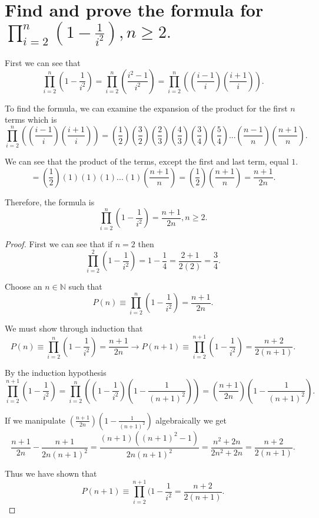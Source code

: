 \documentclass[11pt]{article}
\begin{document}
\section{Find and prove the formula for $\prod_{i=2}^{n}(1-\frac{1}{i^{2}}), n\geq 2.$}

First we can see that $$\prod_{i=2}^{n}(1-\frac{1}{i^{2}})=\prod_{i=2}^{n}(\frac{i^{2}-1}{i^{2}})=\prod_{i=2}^{n}((\frac{i-1}{i})(\frac{i+1}{i})).$$

To find the formula, we can examine the expansion of the product for the first $n$ terms which is $$\prod_{i=2}^{n}((\frac{i-1}{i})(\frac{i+1}{i}))=(\frac{1}{2})(\frac{3}{2})(\frac{2}{3})(\frac{4}{3})(\frac{3}{4})(\frac{5}{4})...(\frac{n-1}{n})(\frac{n+1}{n}).$$

We can see that the product of the terms, except the first and last term, equal $1$. $$=(\frac{1}{2})(1)(1)(1)...(1)(\frac{n+1}{n})=(\frac{1}{2})(\frac{n+1}{n})=\frac{n+1}{2n}.$$

Therefore, the formula is $$\prod_{i=2}^{n}(1-\frac{1}{i^{2}})=\frac{n+1}{2n}, n\geq2.$$

\begin{proof}
First we can see that if $n=2$ then $$\prod_{i=2}^{2}(1-\frac{1}{i^{2}})=1-\frac{1}{4}=\frac{2+1}{2(2)}=\frac{3}{4}.$$

Choose an $n\in\mathbb{N}$ such that $$P(n)\equiv\prod_{i=2}^{n}(1-\frac{1}{i^{2}})=\frac{n+1}{2n}.$$

We must show through induction that $$P(n)\equiv\prod_{i=2}^{n}(1-\frac{1}{i^{2}})=\frac{n+1}{2n}\longrightarrow P(n+1)\equiv\prod_{i=2}^{n+1}(1-\frac{1}{i^{2}})=\frac{n+2}{2(n+1)}.$$

By the induction hypothesis $$\prod_{i=2}^{n+1}(1-\frac{1}{i^{2}})=\prod_{i=2}^{n}((1-\frac{1}{i^{2}})(1-\frac{1}{(n+1)^{2}}))=(\frac{n+1}{2n})(1-\frac{1}{(n+1)^{2}}).$$

If we manipulate $(\frac{n+1}{2n})(1-\frac{1}{(n+1)^{2}})$ algebraically we get $$\frac{n+1}{2n}-\frac{n+1}{2n(n+1)^{2}}=\frac{(n+1)((n+1)^{2}-1)}{2n(n+1)^{2}}=\frac{n^{2}+2n}{2n^{2}+2n}=\frac{n+2}{2(n+1)}.$$

Thus we have shown that $$P(n+1)\equiv\prod_{i=2}^{n+1}(1-\frac{1}{i^{2}}=\frac{n+2}{2(n+1)}.$$


\end{proof}
\end{document}
